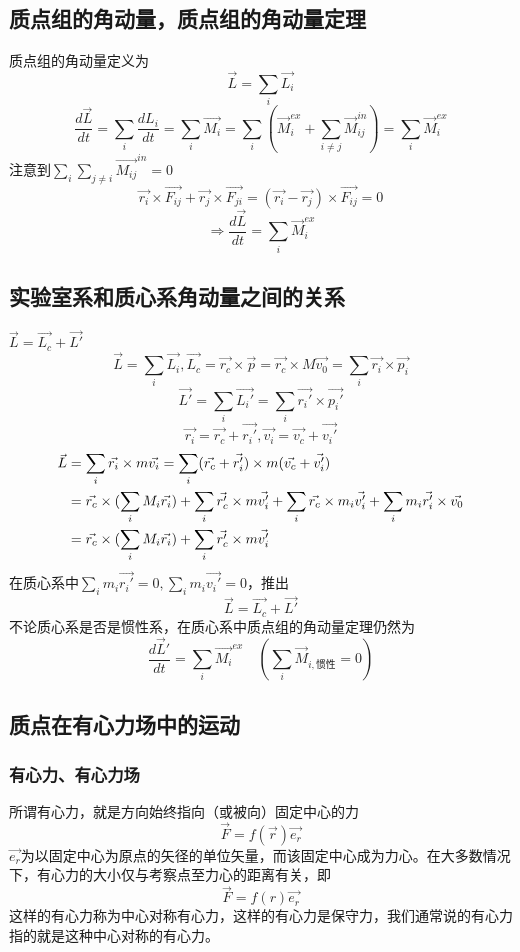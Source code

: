 \subsection{质点组的角动量，质点组的角动量定理}
质点组的角动量定义为\[\vec{L}=\sum_i \vec{L_i}\]
\[\frac{d\vec{L}}{dt}=\sum_i \frac{dL_i}{dt}=\sum_i \vec{M_i} = \sum_i(\vec{M}_i^{ex}+\sum_{i\ne j} \vec{M}_{ij}^{in}) = \sum_i\vec{M}_i^{ex}\]
注意到$\sum_i \sum_{j\ne i} \vec{M_{ij}}^{in} = 0$
\[\vec{r_i}\times\vec{F_{ij}}+\vec{r_j}\times\vec{F_{ji}}=(\vec{r_i}-\vec{r_j})\times\vec{F_{ij}}=0\]
\[\Rightarrow \frac{d\vec{L}}{dt}=\sum_i \vec{M}_i^{ex}\]
\subsection{实验室系和质心系角动量之间的关系}
$\vec{L}=\vec{L_c}+\vec{L'}$
\[\vec{L}=\sum_i \vec{L_i},\vec{L_c}=\vec{r_c}\times\vec{p}=\vec{r_c}\times M\vec{v_0} = \sum_i \vec{r_i}\times\vec{p_i}\]
\[\vec{L'}=\sum_i \vec{L_i'}=\sum_i \vec{r_i'}\times\vec{p_i'}\]
\[\vec{r_i}=\vec{r_c}+\vec{r_i'},\vec{v_i}=\vec{v_c}+\vec{v_i'}\]
\begin{align}
\vec{L}&=\sum_i \vec{r_i}\times m\vec{v_i}=\sum_i (\vec{r_c}+\vec{r_i'})\times m(\vec{v_c}+\vec{v_i'})\notag \\
&=\vec{r_c}\times(\sum_i M_i\vec{r_i})+\sum_i \vec{r_c'}\times m \vec{v_i'}+\sum_i \vec{r_c}\times m_i \vec{v_i'}+\sum_i m_i \vec{r_i'}\times\vec{v_0} \notag \\
&=\vec{r_c}\times(\sum_i M_i\vec{r_i})+\sum_i \vec{r_c'}\times m \vec{v_i'}\notag
\end{align}
在质心系中$\sum_i m_i \vec{r_i'}=0,\sum_i m_i\vec{v_i'}=0$，推出
\[\vec{L}=\vec{L_c}+\vec{L'}\]
不论质心系是否是惯性系，在质心系中质点组的角动量定理仍然为
\[\frac{d\vec{L}'}{dt}=\sum_i \vec{M_i}^{ex}\quad(\sum_i \vec{M}_{i,\text{惯性}}=0)\]
\subsection{质点在有心力场中的运动}
\subsubsection{有心力、有心力场}
所谓有心力，就是方向始终指向（或被向）固定中心的力
\[\vec{F}=f(\vec{r})\vec{e_r}\]
$\vec{e_r}$为以固定中心为原点的矢径的单位矢量，而该固定中心成为力心。在大多数情况下，有心力的大小仅与考察点至力心的距离有关，即
\[\vec{F}=f(r)\vec{e_r}\]
这样的有心力称为中心对称有心力，这样的有心力是保守力，我们通常说的有心力指的就是这种中心对称的有心力。

